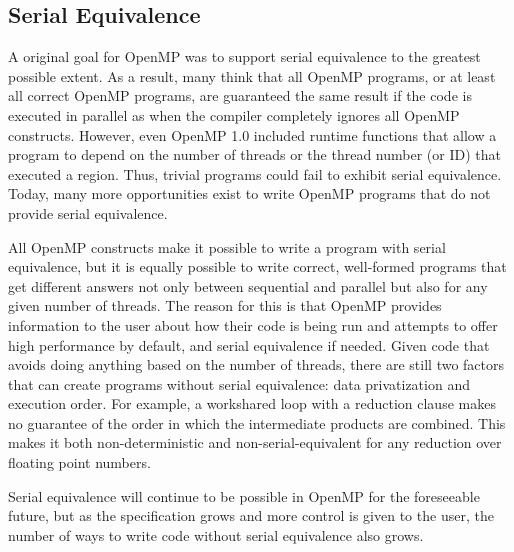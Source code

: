 \subsection{Serial Equivalence}
\label{sub:serial_equivalence}

A original goal for OpenMP was to support serial equivalence to the 
greatest possible extent. As a result, many think that all OpenMP programs, 
or at least all correct OpenMP programs, are guaranteed the same result
if the code is executed in parallel as when the compiler completely 
ignores all OpenMP constructs. However, even OpenMP 1.0 included runtime
functions that allow a program to depend on the number of threads or the
thread number (or ID) that executed a region. Thus, trivial programs could
fail to exhibit serial equivalence. Today, many more opportunities exist
to write OpenMP programs that do not provide serial equivalence. 


All OpenMP constructs make it possible to write a program with
serial equivalence, but it is equally possible to write correct, well-formed
programs that get different answers not only between sequential and parallel but
also for any given number of threads.
The reason for this is that OpenMP provides information to the user about how
their code is being run and attempts to offer high performance by default, and
serial equivalence if needed.  Given code that avoids doing anything based on 
the number of threads, there are still two factors that can create programs 
without serial equivalence: data privatization and execution order.  For 
example, a
workshared loop with a reduction clause makes no guarantee of the order in which
the intermediate products are combined.  This makes it both non-deterministic
and non-serial-equivalent for any reduction over floating point numbers.

Serial equivalence will continue to be possible in OpenMP for the foreseeable
future, but as the specification grows and more control is given to the user,
the number of ways to write code without serial equivalence also grows.

